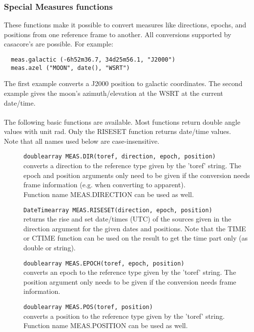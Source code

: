 \subsubsection{\label{TAQL:MEASFUNC}Special Measures functions}
These functions make it possible to convert measures like directions,
epochs, and positions from one reference frame to another. All
conversions supported by casacore's 
are possible.
For example:
\begin{verbatim}
  meas.galactic (-6h52m36.7, 34d25m56.1, "J2000")
  meas.azel ("MOON", date(), "WSRT")
\end{verbatim}
The first example converts a J2000 position to galactic coordinates.
The second example gives the moon's azimuth/elevation at the WSRT at
the current date/time.

\paragraph*{}
The following basic functions are available.
Most functions return double angle values with unit rad. Only the
RISESET function returns date/time values.
\\Note that all names used below are case-insensitive.
\begin{description}
  \item[] \texttt{doublearray MEAS.DIR(toref, direction, epoch, position)}\\
    converts a direction to the reference type given by the 'toref' string.
    The epoch and position arguments only need to be given if the conversion
    needs frame information (e.g. when converting to apparent).\\
    Function name MEAS.DIRECTION can be used as well.
  \item[] \texttt{DateTimearray MEAS.RISESET(direction, epoch, position)}\\
   returns the rise and set date/times (UTC) of the sources given in the
    direction argument for the given dates and positions. Note that
    the TIME or CTIME function can be used on the result to get the
    time part only (as double or string).
  \item[] \texttt{doublearray MEAS.EPOCH(toref, epoch, position)}\\
    converts an epoch to the reference type given by the 'toref' string.
    The position argument only needs to be given if the conversion
    needs frame information.
  \item[] \texttt{doublearray MEAS.POS(toref, position)}\\
    converts a position to the reference type given by the 'toref' string.\\
    Function name MEAS.POSITION can be used as well.
\end{description}

